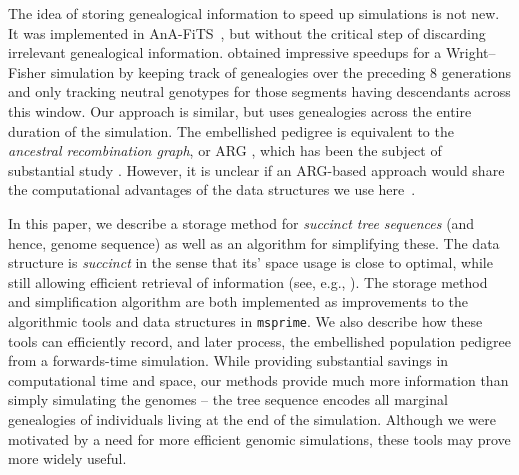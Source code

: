 \documentclass{article}
\newcommand{\msprime}{\texttt{msprime}}
\begin{document}
The idea of storing genealogical information to speed up simulations is not new.
It was implemented in AnA-FiTS~\citep{aberer2013rapid},
but without the critical step of discarding irrelevant genealogical information.
\citet{padhukasahasram2008exploring} obtained impressive speedups for a Wright--Fisher simulation
by keeping track of genealogies over the preceding 8 generations
and only tracking neutral genotypes for those segments having descendants across this window.
Our approach is similar, but uses genealogies across the entire duration of the simulation.
The embellished pedigree is equivalent to the \emph{ancestral recombination graph},
or {ARG} \citep{griffiths1991two,griffiths1997ancestral},
which has been the subject of substantial study
\citep{wiuf1997number,wiuf1999ancestry,marjoram2006coalescent,wilton2015smc}.
However, it is unclear if an ARG-based approach would share
the computational advantages of the data structures we use here~\citep{kelleher2016efficient}.


In this paper, we describe a storage method for \emph{succinct tree sequences}
(and hence, genome sequence) as well as an algorithm for simplifying these.
The data structure is \emph{succinct} in the sense that its' space usage is close to optimal,
while still allowing efficient retrieval of information (see, e.g.,
\citet{gog2014theory}).
The storage method and simplification algorithm are both implemented
as improvements to the algorithmic tools and data structures in \msprime{}.
We also describe how these tools can efficiently record,
and later process, the embellished population pedigree from a forwards-time simulation.
While providing substantial savings in computational time and space, our methods provide much
more information than simply simulating the genomes -- the tree sequence
encodes all marginal genealogies of individuals living at the end of the simulation.
Although we were motivated by a need for more efficient genomic simulations,
these tools may prove more widely useful.
\end{document}
